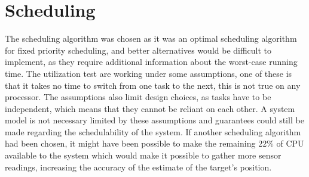 \section{Scheduling}
The scheduling algorithm was chosen as it was an optimal scheduling algorithm for fixed priority scheduling, and better alternatives would be difficult to implement, as they require additional information about the worst-case running time. The utilization test are working under some assumptions, one of these is that it takes no time to switch from one task to the next, this is not true on any processor. The assumptions also limit design choices, as tasks have to be independent, which means that they cannot be reliant on each other. A system model is not necessary limited by these assumptions and guarantees could still be made regarding the schedulability of the system. If another scheduling algorithm had been chosen, it might have been possible to make the remaining 22\% of CPU available to the system which would make it possible to gather more sensor readings, increasing the accuracy of the estimate of the target's position.









